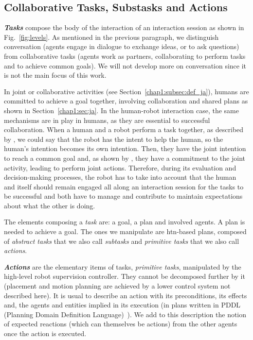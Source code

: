 \documentclass[a4paper,11pt,twoside]{StyleThese}
\begin{document}
\subsection{Collaborative Tasks, Substasks and Actions}
\textbf{\textit{Tasks}} compose the body of the interaction of an interaction session as shown in Fig.~\ref{fig:levels}. As mentioned in the previous paragraph, we distinguish conversation (\ie agents engage in dialogue to exchange ideas, or to ask questions) from collaborative tasks (\ie agents work as partners, collaborating to perform tasks and to achieve common goals). We will not develop more on conversation since it is not the main focus of this work.

In joint or collaborative activities (see Section~\ref{chap1:subsec:def_ja}), humans are committed to achieve a goal together, involving collaboration and shared plans as shown in Section~\ref{chap1:sec:ja}. In the human-robot interaction case, the same mechanisms are in play in humans, as they are essential to successful collaboration. When a human and a robot perform a task together, as described by \cite{bauer_2008_collab}, we could say that the robot has the intent to help the human, so the human's intention becomes its own intention. Then, they have the joint intention to reach a common goal and, as shown by \cite{michael_2017_commitment}, they have a commitment to the joint activity, leading to perform joint actions. Therefore, during its evaluation and decision-making processes, the robot has to take into account that the human and itself should remain engaged all along an interaction session for the tasks to be successful and both have to manage and contribute to maintain expectations about what the other is doing. 

The elements composing a \textit{task} are: a goal, a plan and involved agents. A plan is needed to achieve a goal. The ones we manipulate are \acrshort{htn}-based plans, composed of \emph{abstract tasks} that we also call \emph{subtasks} and \emph{primitive tasks} that we also call \emph{actions}.

\textbf{\textit{Actions}} are the elementary items of tasks, \emph{primitive tasks}, manipulated by the high-level robot supervision controller. They cannot be decomposed further by it (\eg placement and motion planning are achieved by a lower control system not described here). It is usual to describe an action with its preconditions, its effects and, the agents and entities implied in its execution (\eg in plans written in PDDL (Planning Domain Definition Language)~\citep{ghallab_98_pddl}). We add to this description the notion of expected reactions (which can themselves be actions) from the other agents once the action is executed.
\end{document}
